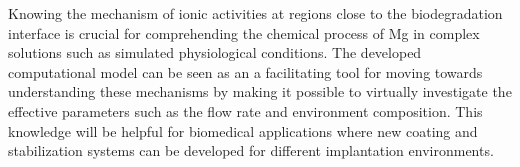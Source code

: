 Knowing the mechanism of ionic activities at regions close to the biodegradation interface is crucial for comprehending the chemical process of Mg in complex solutions such as simulated physiological conditions. The developed computational model can be seen as an a facilitating tool for moving towards understanding these mechanisms by making it possible to virtually investigate the effective parameters such as the flow rate and environment composition. This knowledge will be helpful for biomedical applications where new coating and stabilization systems can be developed for different implantation environments.

%
%
%
%
%
%


\cleardoublepage
